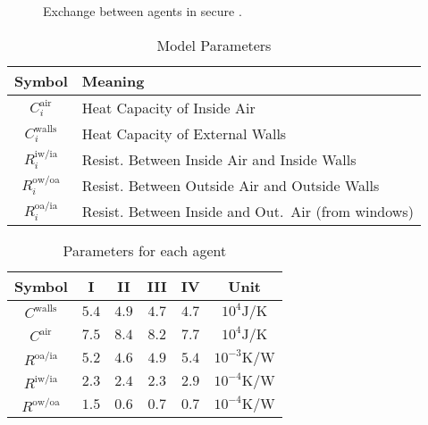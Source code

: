 \documentclass{ifacconf}  %
\begin{document}
\begin{figure}[t]
{
        }
  \caption{Exchange between agents in secure \dmpc{}.}\label{fig:safe_dmpc_graph}
\end{figure}

\begin{table}[b]
  \centering
  \caption{Model Parameters}\label{tab:modelParamMeaning}
  \begin{tabular}[b]{cl}
    \toprule
    Symbol&Meaning\\
    \midrule
    $C^{\text{air}}_{i}$&Heat Capacity of Inside Air\\
    $C^{\text{walls}}_{i}$&Heat Capacity of External Walls\\
    $R^{\text{iw/ia}}_{i}$&Resist. Between Inside Air and Inside Walls\\
    $R^{\text{ow/oa}}_{i}$&Resist. Between Outside Air and Outside Walls\\
    $R^{\text{oa/ia}}_{i}$&Resist. Between Inside and Out.\ Air (from windows)\\
    \bottomrule
  \end{tabular}
\end{table}

  \begin{table}[b]
  \centering
  \caption{
    Parameters for each agent}\label{tab:modelParam}
  \begin{tabular}[t]{cccccc} \toprule
    Symbol& I & II & III & IV &Unit\\
    \midrule
    $C^{\text{walls}}$    &$5.4$&$4.9$&$4.7$&$4.7$ &$10^{4}\mathrm{J/K}$ \\
    $C^{\text{air}}$               &$7.5$ &$8.4 $&$8.2$ &$7.7$&$10^{4}\mathrm{J/K}$  \\
    $R^{\text{oa/ia}}$               &$5.2$&$4.6$&$4.9$&$5.4$&$10^{-3}\mathrm{K/W}$ \\
    $R^{\text{iw/ia}}$               &$2.3$&$2.4$&$2.3$&$2.9$&$10^{-4}\mathrm{K/W}$\\
    $R^{\text{ow/oa}}$               &$1.5$&$0.6$&$0.7$&$0.7$& $10^{-4}\mathrm{K/W}$ \\
    \bottomrule
  \end{tabular}
\end{table}
\end{document}
